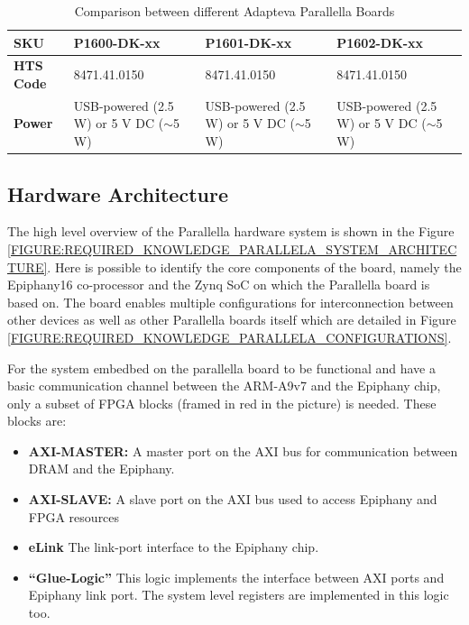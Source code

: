 \begin{table}[]
{\begin{tabular}{|p{3cm}|p{4.5cm}|p{4.5cm}|p{4.5cm}|}
            \textbf{SKU}                          & P1600-DK-xx                                                                           & P1601-DK-xx                                                                           & P1602-DK-xx                                                                           \\ \hline
            \textbf{HTS Code}                     & 8471.41.0150                                                                          & 8471.41.0150                                                                          & 8471.41.0150                                                                          \\ \hline
            \textbf{Power}                        & USB-powered (2.5 W) or 5 V DC ($\sim$5 W)                                             & USB-powered (2.5 W) or 5 V DC ($\sim$5 W)                                             & USB-powered (2.5 W) or 5 V DC ($\sim$5 W)                                             \\ \hline
            \end{tabular}%
        }
        \caption{Comparison between different Adapteva Parallella Boards}
        \label{TABLE_REQUIRED_KNOWLEDGE_PARALLELA_BOARDS}
        \end{table}

    \subsection{Hardware Architecture}
    The high level overview of the Parallella hardware system is shown in the Figure \ref{FIGURE:REQUIRED_KNOWLEDGE_PARALLELA_SYSTEM_ARCHITECTURE}. Here
    is possible to identify the core components of the board, namely the Epiphany16 co-processor and the Zynq SoC on which the Parallella board
    is based on. The board enables multiple configurations for interconnection between other devices as well as other Parallella boards itself which are
    detailed in Figure \ref{FIGURE:REQUIRED_KNOWLEDGE_PARALLELA_CONFIGURATIONS}.

    For the system embedbed on the parallella board to be functional and have a basic communication channel between the ARM-A9v7 and the 
    Epiphany chip, only a subset of FPGA blocks (framed in red in the picture) is needed. These blocks are:

    \begin{itemize}
        \item{\textbf{AXI-MASTER:} A master port on the AXI bus for communication between DRAM and the Epiphany.}
        \item{\textbf{AXI-SLAVE:} A slave port on the AXI bus used to access Epiphany and FPGA resources}
        \item{\textbf{eLink} The link-port interface to the Epiphany chip.}
        \item{\textbf{``Glue-Logic''} This logic implements the interface between AXI ports and Epiphany link port. The system level registers are
         implemented in this logic too.}  
    \end{itemize}
    

